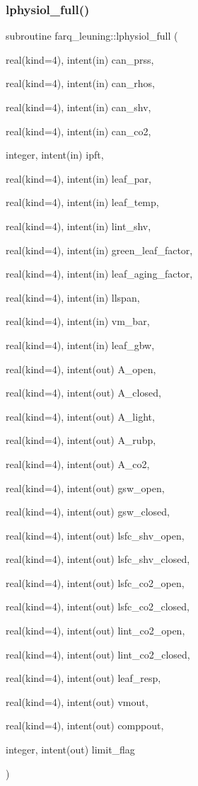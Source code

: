\subsubsection{\texorpdfstring{lphysiol\+\_\+full()}{lphysiol\_full()}}
{\footnotesize\ttfamily subroutine farq\+\_\+leuning\+::lphysiol\+\_\+full (\begin{DoxyParamCaption}\item[{real(kind=4), intent(in)}]{can\+\_\+prss,  }\item[{real(kind=4), intent(in)}]{can\+\_\+rhos,  }\item[{real(kind=4), intent(in)}]{can\+\_\+shv,  }\item[{real(kind=4), intent(in)}]{can\+\_\+co2,  }\item[{integer, intent(in)}]{ipft,  }\item[{real(kind=4), intent(in)}]{leaf\+\_\+par,  }\item[{real(kind=4), intent(in)}]{leaf\+\_\+temp,  }\item[{real(kind=4), intent(in)}]{lint\+\_\+shv,  }\item[{real(kind=4), intent(in)}]{green\+\_\+leaf\+\_\+factor,  }\item[{real(kind=4), intent(in)}]{leaf\+\_\+aging\+\_\+factor,  }\item[{real(kind=4), intent(in)}]{llspan,  }\item[{real(kind=4), intent(in)}]{vm\+\_\+bar,  }\item[{real(kind=4), intent(in)}]{leaf\+\_\+gbw,  }\item[{real(kind=4), intent(out)}]{A\+\_\+open,  }\item[{real(kind=4), intent(out)}]{A\+\_\+closed,  }\item[{real(kind=4), intent(out)}]{A\+\_\+light,  }\item[{real(kind=4), intent(out)}]{A\+\_\+rubp,  }\item[{real(kind=4), intent(out)}]{A\+\_\+co2,  }\item[{real(kind=4), intent(out)}]{gsw\+\_\+open,  }\item[{real(kind=4), intent(out)}]{gsw\+\_\+closed,  }\item[{real(kind=4), intent(out)}]{lsfc\+\_\+shv\+\_\+open,  }\item[{real(kind=4), intent(out)}]{lsfc\+\_\+shv\+\_\+closed,  }\item[{real(kind=4), intent(out)}]{lsfc\+\_\+co2\+\_\+open,  }\item[{real(kind=4), intent(out)}]{lsfc\+\_\+co2\+\_\+closed,  }\item[{real(kind=4), intent(out)}]{lint\+\_\+co2\+\_\+open,  }\item[{real(kind=4), intent(out)}]{lint\+\_\+co2\+\_\+closed,  }\item[{real(kind=4), intent(out)}]{leaf\+\_\+resp,  }\item[{real(kind=4), intent(out)}]{vmout,  }\item[{real(kind=4), intent(out)}]{comppout,  }\item[{integer, intent(out)}]{limit\+\_\+flag }\end{DoxyParamCaption})}

